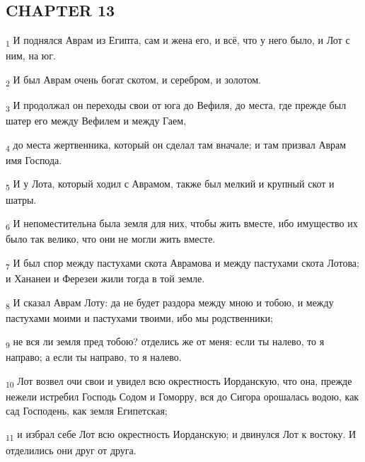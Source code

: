 \subsection{CHAPTER 13}
\begin{tcolorbox}
\textsubscript{1} И поднялся Аврам из Египта, сам и жена его, и всё, что у него было, и Лот с ним, на юг.
\end{tcolorbox}
\begin{tcolorbox}
\textsubscript{2} И был Аврам очень богат скотом, и серебром, и золотом.
\end{tcolorbox}
\begin{tcolorbox}
\textsubscript{3} И продолжал он переходы свои от юга до Вефиля, до места, где прежде был шатер его между Вефилем и между Гаем,
\end{tcolorbox}
\begin{tcolorbox}
\textsubscript{4} до места жертвенника, который он сделал там вначале; и там призвал Аврам имя Господа.
\end{tcolorbox}
\begin{tcolorbox}
\textsubscript{5} И у Лота, который ходил с Аврамом, также был мелкий и крупный скот и шатры.
\end{tcolorbox}
\begin{tcolorbox}
\textsubscript{6} И непоместительна была земля для них, чтобы жить вместе, ибо имущество их было так велико, что они не могли жить вместе.
\end{tcolorbox}
\begin{tcolorbox}
\textsubscript{7} И был спор между пастухами скота Аврамова и между пастухами скота Лотова; и Хананеи и Ферезеи жили тогда в той земле.
\end{tcolorbox}
\begin{tcolorbox}
\textsubscript{8} И сказал Аврам Лоту: да не будет раздора между мною и тобою, и между пастухами моими и пастухами твоими, ибо мы родственники;
\end{tcolorbox}
\begin{tcolorbox}
\textsubscript{9} не вся ли земля пред тобою? отделись же от меня: если ты налево, то я направо; а если ты направо, то я налево.
\end{tcolorbox}
\begin{tcolorbox}
\textsubscript{10} Лот возвел очи свои и увидел всю окрестность Иорданскую, что она, прежде нежели истребил Господь Содом и Гоморру, вся до Сигора орошалась водою, как сад Господень, как земля Египетская;
\end{tcolorbox}
\begin{tcolorbox}
\textsubscript{11} и избрал себе Лот всю окрестность Иорданскую; и двинулся Лот к востоку. И отделились они друг от друга.
\end{tcolorbox}
